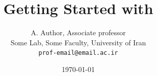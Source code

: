 \documentclass[12pt, a4paper]{article}
\begin{document}
	
%	
%	
%	
%

	\title{Getting Started with \LaTeXe}

	\author{A. Author, Associate professor \\Some Lab, Some Faculty, University of Iran\\ \texttt{prof-email@email.ac.ir}}
	
	   
	\date{\today} %
	
	\maketitle

	
\end{document}
